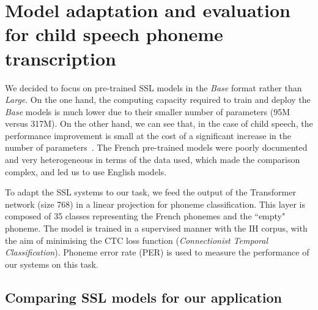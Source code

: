 \documentclass{Interspeech2024}
\begin{document}
\section{Model adaptation and evaluation for child speech phoneme transcription}

We decided to focus on pre-trained SSL models in the \textit{Base} format rather than \textit{Large}. On the one hand, the computing capacity required to train and deploy the \textit{Base} models is much lower due to their smaller number of parameters (95M versus 317M). On the other hand, we can see that, in the case of child speech, the performance improvement is small at the cost of a significant increase in the number of parameters~\cite{Jain2023-AWB}. 
The French pre-trained models were poorly documented and very heterogeneous in terms of the data used, which made the comparison complex, and led us to use English models.

To adapt the SSL systems to our task, we feed the output of the Transformer network (size 768) in a linear projection for phoneme classification.
This layer is composed of 35 classes representing the French phonemes and the ``empty" phoneme. The model is trained in a supervised manner with the IH corpus,
with the aim of minimising the CTC loss function (\textit{Connectionist Temporal Classification}).
Phoneme error rate (PER) is used to measure the performance of our systems on this task.


\subsection{Comparing SSL models for our application}
\label{sec:exp1}
\end{document}
